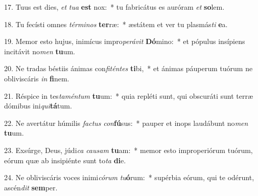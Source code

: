 17. Tuus est dies, \textit{et} \textit{tu}\textit{a} \textbf{est} nox:~*  tu fabricátus es auróram \textit{et} \textbf{so}lem.\

18. Tu fecísti omnes \textit{tér}\textit{mi}\textit{nos} \textbf{ter}ræ:~*  æstátem et ver tu plasmás\textit{ti} \textbf{e}a.\

19. Memor esto hujus, inimícus impro\textit{pe}\textit{rá}\textit{vit} \textbf{Dó}mino:~*  et pópulus insípiens incitávit no\textit{men} \textbf{tu}um.\

20. Ne tradas béstiis ánimas con\textit{fi}\textit{tén}\textit{tes} \textbf{ti}bi,~*  et ánimas páuperum tuórum ne obliviscáris \textit{in} \textbf{fi}nem.\

21. Réspice in tes\textit{ta}\textit{mén}\textit{tum} \textbf{tu}um:~*  quia repléti sunt, qui obscuráti sunt terræ dómibus ini\textit{qui}\textbf{tá}tum.\

22. Ne avertátur húmilis \textit{fac}\textit{tus} \textit{con}\textbf{fú}sus:~*  pauper et inops laudábunt no\textit{men} \textbf{tu}um.\

23. Exsúrge, Deus, júdi\textit{ca} \textit{cau}\textit{sam} \textbf{tu}am:~*  memor esto improperiórum tuórum, eórum quæ ab insipiénte sunt to\textit{ta} \textbf{di}e.\

24. Ne obliviscáris voces inimi\textit{có}\textit{rum} \textit{tu}\textbf{ó}rum:~*  supérbia eórum, qui te odérunt, ascén\textit{dit} \textbf{sem}per.\

